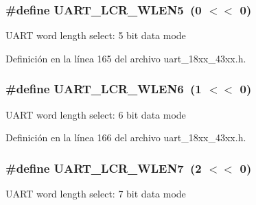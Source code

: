 \subsubsection[{\texorpdfstring{U\+A\+R\+T\+\_\+\+L\+C\+R\+\_\+\+W\+L\+E\+N5}{UART_LCR_WLEN5}}]{\setlength{\rightskip}{0pt plus 5cm}\#define U\+A\+R\+T\+\_\+\+L\+C\+R\+\_\+\+W\+L\+E\+N5~(0 $<$$<$ 0)}\hypertarget{group___u_a_r_t__18_x_x__43_x_x_ga2c64fd92092b8ac1e64b6b1204927682}{}\label{group___u_a_r_t__18_x_x__43_x_x_ga2c64fd92092b8ac1e64b6b1204927682}
U\+A\+RT word length select\+: 5 bit data mode 

Definición en la línea 165 del archivo uart\+\_\+18xx\+\_\+43xx.\+h.

\subsubsection[{\texorpdfstring{U\+A\+R\+T\+\_\+\+L\+C\+R\+\_\+\+W\+L\+E\+N6}{UART_LCR_WLEN6}}]{\setlength{\rightskip}{0pt plus 5cm}\#define U\+A\+R\+T\+\_\+\+L\+C\+R\+\_\+\+W\+L\+E\+N6~(1 $<$$<$ 0)}\hypertarget{group___u_a_r_t__18_x_x__43_x_x_ga916fcefe6db8651be1cb1c066726381d}{}\label{group___u_a_r_t__18_x_x__43_x_x_ga916fcefe6db8651be1cb1c066726381d}
U\+A\+RT word length select\+: 6 bit data mode 

Definición en la línea 166 del archivo uart\+\_\+18xx\+\_\+43xx.\+h.

\subsubsection[{\texorpdfstring{U\+A\+R\+T\+\_\+\+L\+C\+R\+\_\+\+W\+L\+E\+N7}{UART_LCR_WLEN7}}]{\setlength{\rightskip}{0pt plus 5cm}\#define U\+A\+R\+T\+\_\+\+L\+C\+R\+\_\+\+W\+L\+E\+N7~(2 $<$$<$ 0)}\hypertarget{group___u_a_r_t__18_x_x__43_x_x_ga7746eb5a2aac4b9f86e97ee82e5e2a10}{}\label{group___u_a_r_t__18_x_x__43_x_x_ga7746eb5a2aac4b9f86e97ee82e5e2a10}
U\+A\+RT word length select\+: 7 bit data mode 

